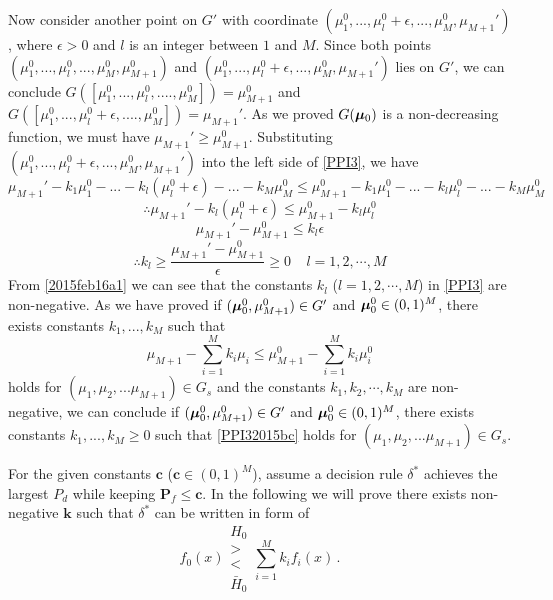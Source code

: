 Now consider another point on $G'$ with coordinate $(\mu_1^0, ..., \mu_l^0+\epsilon, ..., \mu_M^0, \mu_{M+1}')$, where $\epsilon > 0$ and $l$ is an integer between $1$ and $M$.  Since both points $(\mu_1^0, ..., \mu_l^0, ..., \mu_M^0, \mu_{M+1}^0)$ and $(\mu_1^0, ..., \mu_l^0+\epsilon, ..., \mu_M^0, \mu_{M+1}')$ lies on $G'$, we can conclude $G([\mu_1^0, ..., \mu_l^0, ...., \mu_M^0]) = \mu_{M+1}^0$ and $G([\mu_1^0, ..., \mu_l^0 + \epsilon, ...., \mu_M^0]) = \mu_{M+1}'$. As we proved $G(\boldsymbol{\mu}_0)$ is a non-decreasing function, we must have  $\mu_{M+1}' \geq \mu_{M+1}^0$.
Substituting $(\mu_1^0, ..., \mu_l^0+\epsilon, ..., \mu_M^0, \mu_{M+1}')$ into the left side of \eqref{PPI3}, we have
\begin{equation}
\mu_{M+1}' - k_1\mu_1^0 - ... - k_l(\mu_l^0+\epsilon)- ... - k_M\mu_M^0 \leq \mu_{M+1}^0 - k_1\mu_1^0 - ... - k_l\mu_l^0- ... - k_M\mu_M^0
\end{equation}
\begin{equation}
\therefore \mu_{M+1}' - k_l(\mu_l^0+\epsilon)\leq \mu_{M+1}^0 - k_l\mu_l^0
\end{equation}
\begin{equation}
\mu_{M+1}' - \mu_{M+1}^0 \leq k_l\epsilon
\end{equation}
\begin{equation}
\therefore k_l \geq \frac{\mu_{M+1}' - \mu_{M+1}^0}{\epsilon} \geq 0 \;\;\;\;l = 1, 2, \cdots, M
\label{2015feb16a1}
\end{equation}
From \eqref{2015feb16a1} we can see that the constants $k_l$ ($l = 1, 2, \cdots, M$) in \eqref{PPI3} are non-negative.
As we have proved if  $(\boldsymbol{\mu}_0^0, \mu_{M+1}^0) \in G'$ and $\boldsymbol{\mu}_0^0 \in (0, 1)^M$, there exists constants $k_1, ..., k_M$ such that  
\begin{equation}
\mu_{M+1} - \sum_{i=1}^{M}k_i\mu_i \leq \mu_{M+1}^0 - \sum_{i=1}^{M}k_i\mu_i^0
\label{PPI32015bc}
\end{equation}
holds for  $(\mu_1, \mu_2, ...\mu_{M+1}) \in G_s$ and the constants $k_1, k_2, \cdots, k_M$ are non-negative,  
we can conclude 
if  $(\boldsymbol{\mu}_0^0, \mu_{M+1}^0) \in G'$ and $\boldsymbol{\mu}_0^0 \in (0, 1)^M$, there exists constants $k_1, ..., k_M \geq 0 $ such that  
\eqref{PPI32015bc}
holds for  $(\mu_1, \mu_2, ...\mu_{M+1}) \in G_s$. 

For the given constants $\mathbf{c}$ ($\mathbf{c} \in (0, 1)^M$), 
 assume a decision rule $\delta^\ast$  achieves the largest $P_d$  while keeping $\mathbf{P}_f \leq \mathbf{c}$. In the following we will prove there exists non-negative $\mathbf{k}$  such that $\delta^\ast$ can be written in form of 
\[
f_0(x) \substack{H_0 \\ > \\ < \\ \bar{H}_0 } \sum_{i=1}^{M}k_if_i(x)\,.
\]

